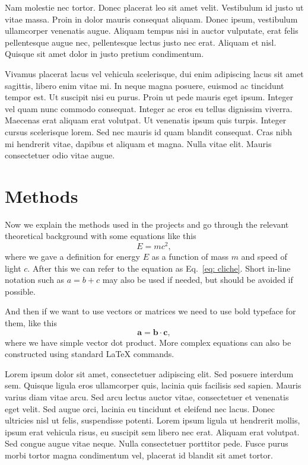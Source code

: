 \documentclass{prace}
\begin{document}
Nam molestie nec tortor. Donec placerat leo sit amet velit. Vestibulum id
justo ut vitae massa. Proin in dolor mauris consequat aliquam. Donec ipsum,
vestibulum ullamcorper venenatis augue. Aliquam tempus nisi in auctor
vulputate, erat felis pellentesque augue nec, pellentesque lectus justo nec
erat. Aliquam et nisl. Quisque sit amet dolor in justo pretium condimentum.

Vivamus placerat lacus vel vehicula scelerisque, dui enim adipiscing lacus sit
amet sagittis, libero enim vitae mi. In neque magna posuere, euismod ac
tincidunt tempor est. Ut suscipit nisi eu purus. Proin ut pede mauris eget
ipsum. Integer vel quam nunc commodo consequat. Integer ac eros eu tellus
dignissim viverra. Maecenas erat aliquam erat volutpat. Ut venenatis ipsum
quis turpis. Integer cursus scelerisque lorem. Sed nec mauris id quam blandit
consequat. Cras nibh mi hendrerit vitae, dapibus et aliquam et magna. Nulla
vitae elit. Mauris consectetuer odio vitae augue.

\section{Methods}
Now we explain the methods used in the projects and go through the relevant
theoretical background\cite{eaton-Porous-Glass-Support-Material-75} with 
some equations like this
\begin{equation}
E = mc^2,
\label{eq: cliche}
\end{equation}
where we gave a definition for energy $E$ as a function of mass $m$ and speed
of light $c$. After this we can refer to the equation as Eq.~\ref{eq: cliche}.
Short in-line notation such as $a = b + c$ may also be used if needed, but 
should be avoided if possible.

And then if we want to use vectors or matrices we need to use bold typeface
for them, like this 
\begin{equation}
{\mathbf a} = {\mathbf b} \cdot \mathbf{c},
\label{eq: vectors}
\end{equation}
where we have simple vector dot product. More complex equations can also be
constructed using standard \LaTeX{} commands.

Lorem ipsum dolor sit amet, consectetuer adipiscing elit. Sed posuere interdum
sem. Quisque ligula eros ullamcorper quis, lacinia quis facilisis sed sapien.
Mauris varius diam vitae arcu. Sed arcu lectus auctor vitae, consectetuer et
venenatis eget velit. Sed augue orci, lacinia eu tincidunt et eleifend nec
lacus. Donec ultricies nisl ut felis, suspendisse potenti. Lorem ipsum ligula
ut hendrerit mollis, ipsum erat vehicula risus, eu suscipit sem libero nec
erat. Aliquam erat volutpat. Sed congue augue vitae neque. Nulla consectetuer
porttitor pede. Fusce purus morbi tortor magna condimentum vel, placerat id
blandit sit amet tortor.
\end{document}
